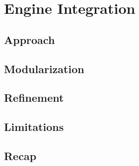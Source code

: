 \chapter{Engine Integration}\label{ch:integration}

\section{Approach}\label{sc:integration:approach}

\section{Modularization}\label{sc:integration:modularization}

\section{Refinement}\label{sc:integration:refinement}

\section{Limitations}\label{sc:integration:limitations}

\section{Recap}\label{sc:integration:recap}
